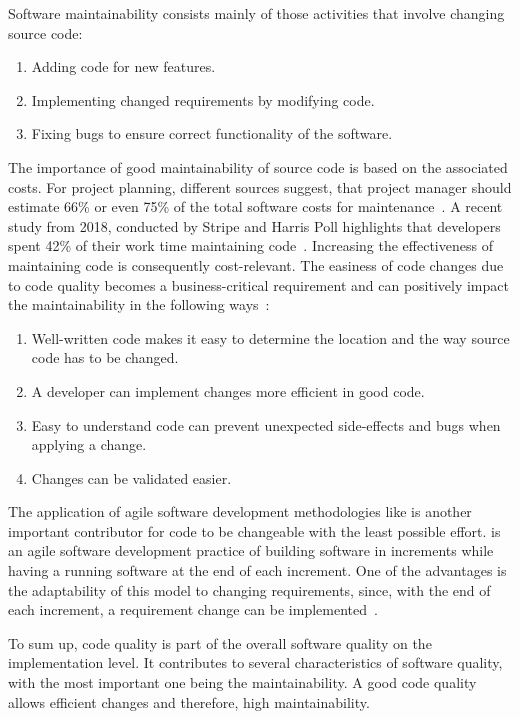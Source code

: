 Software maintainability consists mainly of those activities that involve changing source code:
\begin{enumerate}
    \item Adding code for new features.
    \item Implementing changed requirements by modifying code.
    \item Fixing bugs to ensure correct functionality of the software.
\end{enumerate}
The importance of good maintainability of source code is based on the associated costs. 
For project planning, different sources suggest, that project manager should estimate 66\% or even 75\% of the total software costs for maintenance~\cite{yip_software_1994, galorath_accurately_2019}. A recent study from 2018, conducted by Stripe and Harris Poll highlights that developers spent 42\% of their work time maintaining code~\cite{stripe_developer_2018}. Increasing the effectiveness of maintaining code is consequently cost-relevant. The easiness of code changes due to code quality becomes a business-critical requirement and can positively impact the maintainability in the following ways~\cite{baggen_standardized_2012}:
\begin{enumerate}
    \item Well-written code makes it easy to determine the location and the way source code has to be changed.
    \item A developer can implement changes more efficient in good code.
    \item Easy to understand code can prevent unexpected side-effects and bugs when applying a change.
    \item Changes can be validated easier. 
\end{enumerate}

The application of agile software development methodologies like  is another important contributor for code to be changeable with the least possible effort.  is an agile software development practice of building software in increments while having a running software at the end of each increment. One of the advantages is the adaptability of this model to changing requirements, since, with the end of each increment, a requirement change can be implemented~\cite{schwaber_agile_2002}. 

To sum up, code quality is part of the overall software quality on the implementation level. It contributes to several characteristics of software quality, with the most important one being the maintainability. A good code quality allows efficient changes and therefore, high maintainability.

